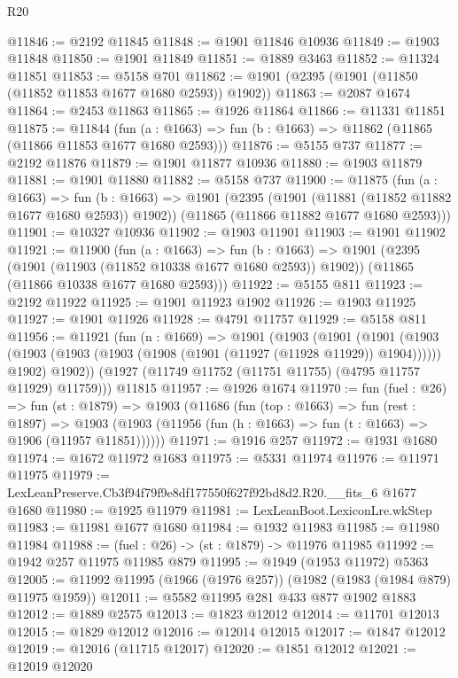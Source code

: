 \begin{lexlean}{R20}
\begin{coremodule}
@11846 := @2192 @11845
@11848 := @1901 @11846 @10936
@11849 := @1903 @11848
@11850 := @1901 @11849
@11851 := @1889 @3463
@11852 := @11324 @11851
@11853 := @5158 @701
@11862 := @1901 (@2395 (@1901 (@11850 (@11852 @11853 @1677 @1680 @2593)) @1902))
@11863 := @2087 @1674
@11864 := @2453 @11863
@11865 := @1926 @11864
@11866 := @11331 @11851
@11875 := @11844
    (fun (a : @1663) => fun (b : @1663) => @11862 (@11865 (@11866 @11853 @1677 @1680 @2593)))
@11876 := @5155 @737
@11877 := @2192 @11876
@11879 := @1901 @11877 @10936
@11880 := @1903 @11879
@11881 := @1901 @11880
@11882 := @5158 @737
@11900 := @11875
    (fun (a : @1663) =>
    fun (b : @1663) =>
    @1901
      (@2395 (@1901 (@11881 (@11852 @11882 @1677 @1680 @2593)) @1902))
      (@11865 (@11866 @11882 @1677 @1680 @2593)))
@11901 := @10327 @10936
@11902 := @1903 @11901
@11903 := @1901 @11902
@11921 := @11900
    (fun (a : @1663) =>
    fun (b : @1663) =>
    @1901
      (@2395 (@1901 (@11903 (@11852 @10338 @1677 @1680 @2593)) @1902))
      (@11865 (@11866 @10338 @1677 @1680 @2593)))
@11922 := @5155 @811
@11923 := @2192 @11922
@11925 := @1901 @11923 @1902
@11926 := @1903 @11925
@11927 := @1901 @11926
@11928 := @4791 @11757
@11929 := @5158 @811
@11956 := @11921
    (fun (n : @1669) =>
    @1901
      (@1903
        (@1901
          (@1901
            (@1903 (@1903 (@1903 (@1903 (@1908 (@1901 (@11927 (@11928 @11929)) @1904))))))
            @1902)
          @1902))
      (@1927 (@11749 @11752 (@11751 @11755) (@4795 @11757 @11929) @11759)))
    @11815
@11957 := @1926 @1674
@11970 := fun (fuel : @26) =>
  fun (st : @1879) =>
  @1903
    (@11686
      (fun (top : @1663) =>
      fun (rest : @1897) =>
      @1903 (@1903 (@11956 (fun (h : @1663) => fun (t : @1663) => @1906 (@11957 @11851))))))
@11971 := @1916 @257
@11972 := @1931 @1680
@11974 := @1672 @11972 @1683
@11975 := @5331 @11974
@11976 := @11971 @11975
@11979 := LexLeanPreserve.Cb3f94f79f9e8df177550f627f92bd8d2.R20.__fits_6 @1677 @1680
@11980 := @1925 @11979
@11981 := LexLeanBoot.LexiconLre.wkStep
@11983 := @11981 @1677 @1680
@11984 := @1932 @11983
@11985 := @11980 @11984
@11988 := (fuel : @26) -> (st : @1879) -> @11976 @11985
@11992 := @1942 @257 @11975 @11985 @879
@11995 := @1949 (@1953 @11972) @5363
@12005 := @11992 @11995 (@1966 (@1976 @257)) (@1982 (@1983 (@1984 @879) @11975 @1959))
@12011 := @5582 @11995 @281 @433 @877 @1902 @1883
@12012 := @1889 @2575
@12013 := @1823 @12012
@12014 := @11701 @12013
@12015 := @1829 @12012
@12016 := @12014 @12015
@12017 := @1847 @12012
@12019 := @12016 (@11715 @12017)
@12020 := @1851 @12012
@12021 := @12019 @12020

\end{coremodule}
\end{lexlean}
